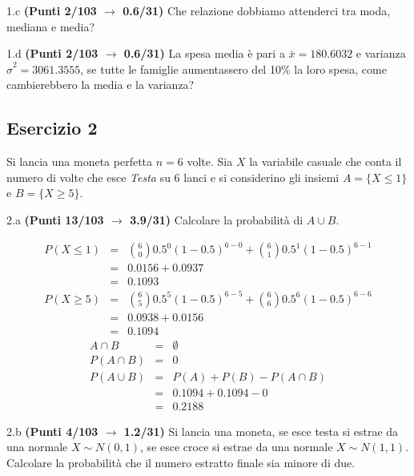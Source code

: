 \documentclass[
  11pt,
]{book}
\theoremstyle{mytheoremstyle}
\theoremstyle{mydefstyle}
\newenvironment{sol}
  {
  \begin{tcolorbox}[enhanced,breakable,arc=0.1mm,boxrule=1pt,colback=white,colframe=iblue,
  title=\bf \fontfamily{lmss}\selectfont \hspace{.5 cm} Soluzione,drop fuzzy shadow]

}{
\end{tcolorbox}
  }
\begin{document}
1.c \textbf{(Punti 2/103 \(\rightarrow\) 0.6/31)} Che relazione dobbiamo attenderci tra moda, mediana e media?

1.d \textbf{(Punti 2/103 \(\rightarrow\) 0.6/31)} La spesa media è pari a \(\bar x=180.6032\) e varianza \(\hat\sigma^2=3061.3555\), se tutte le famiglie aumentassero
del 10\% la loro spesa, come cambierebbero la media e la varianza?

\subsection{Esercizio 2}\label{esercizio-2-29}

Si lancia una moneta perfetta \(n=6\) volte. Sia \(X\) la variabile casuale che conta
il numero di volte che esce \emph{Testa} su 6 lanci e si considerino gli insiemi \(A=\{X\le 1\}\) e \(B=\{X\ge 5\}\).

2.a \textbf{(Punti 13/103 \(\rightarrow\) 3.9/31)} Calcolare la probabilità di \(A\cup B\).

\begin{sol}
\normalsize 
\begin{eqnarray*}
      P( X \leq 1 ) &=& \binom{ 6 }{ 0 } 0.5 ^{ 0 }(1- 0.5 )^{ 6 - 0 }+\binom{ 6 }{ 1 } 0.5 ^{ 1 }(1- 0.5 )^{ 6 - 1 } \\                 &=& 0.0156+0.0937 \\                 &=& 0.1093 
   \end{eqnarray*}
\normalsize  \normalsize 
\begin{eqnarray*}
      P( X \geq 5 ) &=& \binom{ 6 }{ 5 } 0.5 ^{ 5 }(1- 0.5 )^{ 6 - 5 }+\binom{ 6 }{ 6 } 0.5 ^{ 6 }(1- 0.5 )^{ 6 - 6 } \\                 &=& 0.0938+0.0156 \\                 &=& 0.1094 
   \end{eqnarray*}
\normalsize 
\begin{eqnarray*}
A\cap B &=& \emptyset\\
P(A\cap B) &=& 0\\
  P(A\cup B) &=&  P(A)+P(B)-P(A\cap B)\\
  &=& 0.1094+0.1094-0\\
  &=& 0.2188
\end{eqnarray*}

\end{sol}

2.b \textbf{(Punti 4/103 \(\rightarrow\) 1.2/31)} Si lancia una moneta, se esce testa si estrae da una normale \(X\sim N(0,1)\), se esce croce si estrae
da una normale \(X\sim N(1,1)\). Calcolare la probabilità che il numero estratto finale sia minore di due.
\end{document}
